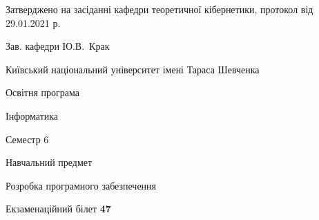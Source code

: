 \documentclass[10pt, ukrainian]{article}
\begin{document}
{\vspace{5mm}\smallskip \begin {small} Затверджено на засіданні кафедри теоретичної кібернетики, протокол  від   29.01.2021 р.\par\smallskip\smallskip
{\parbox {6.5 cm}{Зав. кафедри \dotfill Ю.В.~Крак}} \end{small}}
\newpage

{{\begin {small}\par
{ \center  Київський національний університет імені Тараса Шевченка \par}
{\parbox {5 cm}{Освітня програма \hfill}{\parbox {7 cm}{Інформатика \hfill}}\parbox {6 cm}{\hfill Семестр 6}}\par
{\parbox {5 cm} {Навчальний предмет \hfill}\parbox {7 cm}{Розробка програмного забезпечення \hfill}\parbox {6cm}{\hfill}\par}\vspace{-7pt} \end{small}}{\center Екзаменаційний білет \No \textbf
{ 47 }\par}}
\end{document}
